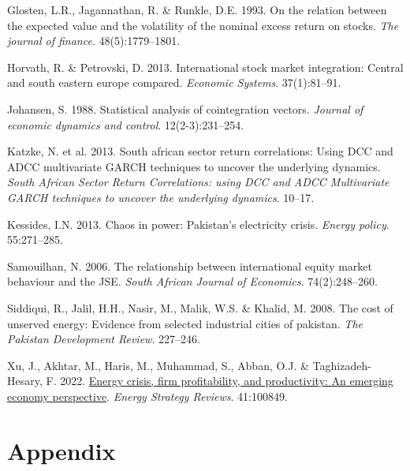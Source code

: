 \documentclass[11pt,preprint, authoryear]{elsarticle}
\numberwithin{equation}{section}
\numberwithin{figure}{section}
\numberwithin{table}{section}
\newlength{\cslhangindent}
\newenvironment{CSLReferences}%
  {\setlength{\parindent}{0pt}%
  \everypar{\setlength{\hangindent}{\cslhangindent}}\ignorespaces}%
  {\par}
\begin{document}
\begin{CSLReferences}{1}{0}
\leavevmode{}%
Glosten, L.R., Jagannathan, R. \& Runkle, D.E. 1993. On the relation
between the expected value and the volatility of the nominal excess
return on stocks. \emph{The journal of finance}. 48(5):1779--1801.

\leavevmode{}%
Horvath, R. \& Petrovski, D. 2013. International stock market
integration: Central and south eastern europe compared. \emph{Economic
Systems}. 37(1):81--91.

\leavevmode{}%
Johansen, S. 1988. Statistical analysis of cointegration vectors.
\emph{Journal of economic dynamics and control}. 12(2-3):231--254.

\leavevmode{}%
Katzke, N. et al. 2013. South african sector return correlations: Using
DCC and ADCC multivariate GARCH techniques to uncover the underlying
dynamics. \emph{South African Sector Return Correlations: using DCC and
ADCC Multivariate GARCH techniques to uncover the underlying dynamics}.
10--17.

\leavevmode{}%
Kessides, I.N. 2013. Chaos in power: Pakistan's electricity crisis.
\emph{Energy policy}. 55:271--285.

\leavevmode{}%
Samouilhan, N. 2006. The relationship between international equity
market behaviour and the JSE. \emph{South African Journal of Economics}.
74(2):248--260.

\leavevmode{}%
Siddiqui, R., Jalil, H.H., Nasir, M., Malik, W.S. \& Khalid, M. 2008.
The cost of unserved energy: Evidence from selected industrial cities of
pakistan. \emph{The Pakistan Development Review}. 227--246.

\leavevmode{}%
Xu, J., Akhtar, M., Haris, M., Muhammad, S., Abban, O.J. \&
Taghizadeh-Hesary, F. 2022.
\href{https://doi.org/10.1016/j.esr.2022.100849}{Energy crisis, firm
profitability, and productivity: An emerging economy perspective}.
\emph{Energy Strategy Reviews}. 41:100849.

\end{CSLReferences}

\hypertarget{appendix}{%
\section*{Appendix}\label{appendix}}
\end{document}
